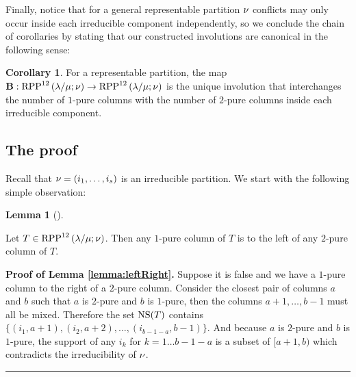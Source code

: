 \documentclass[numbers=enddot,12pt,final,onecolumn,notitlepage]{scrartcl}%
\theoremstyle{definition}
\newtheorem{lem}[theo]{Lemma}
\newenvironment{lemma}[1][]
{\begin{lem}[#1]\begin{leftbar}}
{\end{leftbar}\end{lem}}
\newtheorem{coro}[theo]{Corollary}
\newenvironment{proof}[1][Proof]{\noindent\textbf{#1.} }{\ \rule{0.5em}{0.5em}}
\begin{document}
Finally, notice that for a general representable partition ${{\nu}}$ conflicts may only occur inside each irreducible component independently, so we conclude the chain of corollaries by stating that our constructed involutions are canonical in the following sense:

\begin{coro}
 For a representable partition, the map $\mathbf{B}:{\operatorname*{RPP}^{12}\left( \lambda/\mu ;{{\nu}} \right)}\to{\operatorname*{RPP}^{12}\left( \lambda/\mu ;{{\nu}}\right)}$ is the unique involution that interchanges the number of $1$-pure columns with the number of $2$-pure columns inside each irreducible component.
\end{coro}

\subsection{The proof}
Recall that ${{\nu}}=(i_1,\dots,i_s)$ is an irreducible partition. We start with the following simple observation:
\begin{lemma}
\label{lemma:leftRight}
 Let $T\in{\operatorname*{RPP}^{12}\left( \lambda/\mu ;{{\nu}}\right)}$. Then any $1$-pure column of $T$ is to the left of any $2$-pure column of $T$.
\end{lemma}
\begin{proof}[Proof of Lemma \ref{lemma:leftRight}]
Suppose it is false and we have a $1$-pure column to the right of a $2$-pure column. Consider the closest pair of columns $a$ and $b$ such that $a$ is $2$-pure and $b$ is $1$-pure, then the columns $a+1,\dots,b-1$ must all be mixed. %
Therefore the set ${\operatorname*{NS}}(T)$ contains $\{(i_1,a+1),(i_2,a+2),\dots,(i_{b-1-a},b-1)\}$. And because $a$ is $2$-pure and $b$ is $1$-pure, the support of any $i_k$ for $k=1\dots b-1-a$ is a subset of $[a+1,b)$ which contradicts the irreducibility of ${{\nu}}$.
\end{proof}
\end{document}
